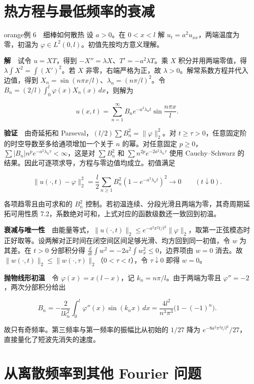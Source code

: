 \documentclass[12pt,a4paper]{article}
\newcommand{\mysection}[1]{\clearpage\section{#1}}
\begin{document}
\mysection{热方程与最低频率的衰减}




\begin{sboxenv}{orange}{例 6　细棒如何散热}
设 \(a>0\)。在 \(0<x<l\) 解 \(u_t=a^2u_{xx}\)，两端温度为零，初温为 \(\varphi\in L^2(0,l)\)。初值先按均方意义理解。
\end{sboxenv}

\textbf{解}　试令 \(u=XT\)，得到 \(-X''=\lambda X\)、\(T'=-a^2\lambda T\)。乘 \(X\) 积分并用两端零值，得 \(\lambda\int X^2=\int(X')^2\)。若 \(X\) 非零，右端严格为正，故 \(\lambda>0\)。解常系数方程并代入边值，得到 \(X_n=\sin(n\pi x/l)\)、\(\lambda_n=(n\pi/l)^2\)。令 \(B_n=(2/l)\int_0^l\varphi(x)X_n(x)\,dx\)，则解为

\[
 u(x,t)=\sum_{n=1}^{\infty}B_n e^{-a^2\lambda_n t}\sin\frac{n\pi x}{l}.
\]

\textbf{验证}　由奇延拓和 Parseval，\((l/2)\sum B_n^2=\|\varphi\|_2^2\)。对 \(t\ge\tau>0\)，任意固定阶的时空导数至多给通项增加一个关于 \(n\) 的幂。对任意固定 \(p\ge0\)，\(\sum |B_n| n^p e^{-a^2\lambda_n\tau}<\infty\)，这是对 \(\sum B_n^2\) 和 \(\sum n^{2p}e^{-2a^2\lambda_n\tau}\) 使用 Cauchy--Schwarz 的结果。因此可逐项求导，方程与零边值均成立。初值满足

\[
 \|u(\cdot,t)-\varphi\|_2^2
 =\frac l2\sum_{n\ge1}B_n^2(1-e^{-a^2\lambda_n t})^2\longrightarrow0
 \qquad(t\downarrow0).
\]

各项趋零且由可求和的 \(B_n^2\) 控制。若初温连续、分段光滑且两端为零，其奇周期延拓可用性质 7.2，系数绝对可和，上式对应的函数级数还一致回到初温。

\textbf{衰减与唯一性}　由能量等式，\(\|u(\cdot,t)\|_2\le e^{-a^2\pi^2t/l^2}\|\varphi\|_2\)，取第一正弦模态时正好取等。设两解对正时间在闭空间区间足够光滑、均方回到同一初值，令 \(w\) 为其差。在 \(t>0\) 分部积分得 \(\frac{d}{dt}\int w^2=-2a^2\int w_x^2\le0\)，边界项由 \(w=0\) 消去。故 \(\|w(\cdot,t)\|_2\le\|w(\cdot,\tau)\|_2\)（\(0<\tau<t\)），令 \(\tau\downarrow0\) 即得 \(w=0\)。

\textbf{抛物线形初温}　令 \(\varphi(x)=x(l-x)\)，记 \(k_n=n\pi/l\)。由于两端为零且 \(\varphi''=-2\)，两次分部积分给出

\[
 B_n=-\frac{2}{lk_n^2}\int_0^l\varphi''(x)\sin(k_n x)\,dx
 =\frac{4l^2}{n^3\pi^3}\big(1-(-1)^n\big).
\]

故只有奇频率。第三频率与第一频率的振幅比从初始的 \(1/27\) 降为 \(e^{-8a^2\pi^2t/l^2}/27\)，直接量化了短波先消失的速度。

\mysection{从离散频率到其他 Fourier 问题}
\end{document}

